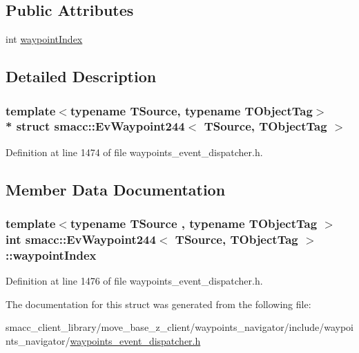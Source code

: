\subsection*{Public Attributes}
\begin{DoxyCompactItemize}
\item 
int \hyperlink{structsmacc_1_1EvWaypoint244_a45d682d397668d321bebabf1237623cc}{waypoint\+Index}
\end{DoxyCompactItemize}


\subsection{Detailed Description}
\subsubsection*{template$<$typename T\+Source, typename T\+Object\+Tag$>$\\*
struct smacc\+::\+Ev\+Waypoint244$<$ T\+Source, T\+Object\+Tag $>$}



Definition at line 1474 of file waypoints\+\_\+event\+\_\+dispatcher.\+h.



\subsection{Member Data Documentation}
\subsubsection[{\texorpdfstring{waypoint\+Index}{waypointIndex}}]{\setlength{\rightskip}{0pt plus 5cm}template$<$typename T\+Source , typename T\+Object\+Tag $>$ int {\bf smacc\+::\+Ev\+Waypoint244}$<$ T\+Source, T\+Object\+Tag $>$\+::waypoint\+Index}\hypertarget{structsmacc_1_1EvWaypoint244_a45d682d397668d321bebabf1237623cc}{}\label{structsmacc_1_1EvWaypoint244_a45d682d397668d321bebabf1237623cc}


Definition at line 1476 of file waypoints\+\_\+event\+\_\+dispatcher.\+h.



The documentation for this struct was generated from the following file\+:\begin{DoxyCompactItemize}
\item 
smacc\+\_\+client\+\_\+library/move\+\_\+base\+\_\+z\+\_\+client/waypoints\+\_\+navigator/include/waypoints\+\_\+navigator/\hyperlink{waypoints__event__dispatcher_8h}{waypoints\+\_\+event\+\_\+dispatcher.\+h}\end{DoxyCompactItemize}

